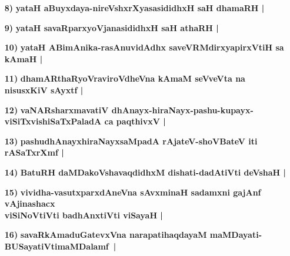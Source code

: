 \begin{itemize}
\item [\bf 8)] {\bf yataH aBuyxdaya-nireVshxrXyasasididhxH saH dhamaRH |}\label{94}
\item [\bf 9)] {\bf yataH savaRparxyoVjanasididhxH saH athaRH |}\label{94}
\item [\bf 10)] {\bf yataH ABimAnika-rasAnuvidAdhx saveVRMdirxyapirxVtiH sa kAmaH |}\label{94}
\item [\bf 11)] {\bf dhamARthaRyoVraviroVdheVna kAmaM seVveVta na nisusxKiV sAyxtf |}\label{95}
\item [\bf 12)] {\bf vaNARsharxmavatiV dhAnayx-hiraNayx-pashu-kupayx-viSiTxvishiSaTxPaladA ca paqthivxV |}\label{95}
\item [\bf 13)] {\bf pashudhAnayxhiraNayxsaMpadA rAjateV-shoVBateV iti rASaTxrXmf |}\label{95}
\item [\bf 14)] {\bf BatuRH daMDakoVshavaqdidhxM dishati-dadAtiVti deVshaH |}\label{95}
\item [\bf 15)] {\bf vividha-vasutxparxdAneVna sAvxminaH sadamxni gajAnf vAjinashacx}\\ {\bf viSiNoVtiVti badhAnxtiVti viSayaH |}
\item [\bf 16)] {\bf savaRkAmaduGatevxVna narapatihaqdayaM maMDayati-BUSayatiVti\break maMDalamf~|}\label{95}


\end{itemize}
